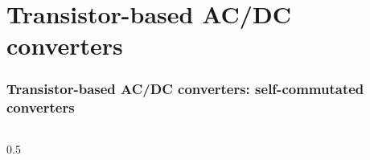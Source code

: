 \section{Transistor-based AC/DC converters}

\begin{frame}
	\frametitle{Transistor-based AC/DC converters: self-commutated converters}
	\begin{columns}
		\begin{column}{0.5\textwidth}


\end{column}
\end{columns}
\end{frame}
